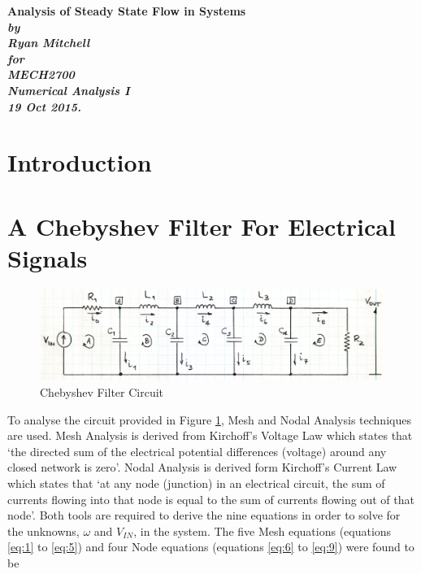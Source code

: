 \documentclass[11pt,a4paper]{article}
\begin{document}
\begin{titlepage}
\renewcommand{\baselinestretch}{1.0}
\begin{center}

\vspace*{30mm}
\Huge\bf
		Analysis of Steady State Flow in Systems\\
\vspace{20mm}
\large\sl
		by\\
		Ryan Mitchell
		\medskip\\
\rm
\large\sl
		for\\
		MECH2700\\
		Numerical Analysis I\\
\vspace{25mm}
		19 Oct 2015.		
\end{center}
\end{titlepage}


\tableofcontents
\listoffigures
\newpage

\section{Introduction}
\newpage

\section{A Chebyshev Filter For Electrical Signals}

\medskip	
\begin{figure}[h]
	\centering
	\includegraphics[width=0.9\linewidth]{Images/Circuit.png}
	\caption{Chebyshev Filter Circuit}
	\label{fig:circuit}
\end{figure}

To analyse the circuit provided in Figure \ref{fig:circuit}, Mesh and Nodal Analysis techniques are used. Mesh Analysis is derived from Kirchoff's Voltage Law which states that `the directed sum of the electrical potential differences (voltage) around any closed network is zero'. Nodal Analysis is derived form Kirchoff's Current Law which states that `at any node (junction) in an electrical circuit, the sum of currents flowing into that node is equal to the sum of currents flowing out of that node'. Both tools are required to derive the nine equations in order to solve for the unknowns, $\omega$ and $V_{IN}$, in the system. The five Mesh equations (equations \ref{eq:1} to \ref{eq:5}) and four Node equations (equations \ref{eq:6} to \ref{eq:9}) were found to be
\end{document}
